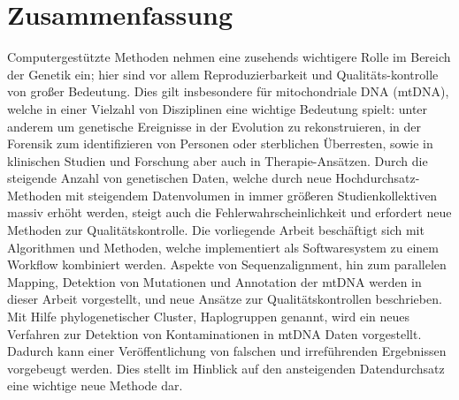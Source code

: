 \section*{Zusammenfassung}
Computergestützte Methoden nehmen eine zusehends wichtigere Rolle im Bereich der Genetik ein; hier sind vor allem Reproduzierbarkeit und Qualit\"ats-kontrolle von gro{\ss}er Bedeutung. Dies gilt insbesondere für mitochondriale DNA (mtDNA), welche in einer Vielzahl von Disziplinen eine wichtige Bedeutung spielt: unter anderem um genetische Ereignisse in der Evolution zu rekonstruieren, in der Forensik zum identifizieren von Personen oder sterblichen \"Uberresten, sowie in klinischen Studien und Forschung aber auch in Therapie-Ans\"atzen. Durch die steigende Anzahl von genetischen Daten, welche durch neue Hochdurchsatz-Methoden mit steigendem Datenvolumen in immer gr\"o{\ss}eren Studienkollektiven massiv erh\"oht werden, steigt auch die Fehlerwahrscheinlichkeit und erfordert neue Methoden zur Qualit\"atskontrolle. Die vorliegende Arbeit besch\"aftigt sich mit Algorithmen und Methoden, welche implementiert als Softwaresystem zu einem Workflow kombiniert werden. Aspekte von Sequenzalignment, hin zum parallelen Mapping, Detektion von Mutationen und Annotation der mtDNA werden in dieser Arbeit vorgestellt, und neue Ans\"atze zur Qualit\"atskontrollen beschrieben. Mit Hilfe phylogenetischer Cluster, Haplogruppen genannt, wird ein neues Verfahren zur Detektion von Kontaminationen in mtDNA Daten vorgestellt. Dadurch kann einer Ver\"offentlichung von falschen und irref\"uhrenden Ergebnissen vorgebeugt werden. Dies stellt im Hinblick auf den ansteigenden Datendurchsatz eine wichtige neue Methode dar.



